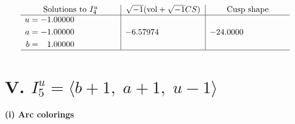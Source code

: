 \documentclass[1p]{elsarticle_modified}
\theoremstyle{definition}
\newcommand{\I}{\sqrt{-1}}
\begin{document}
$$\begin{array}{c|c|c}  
\text{Solutions to }I^u_{4}& \I (\text{vol} + \sqrt{-1}CS) & \text{Cusp shape}\\
 \hline 
\begin{aligned}
u &= -1.00000\phantom{ +0.000000I} \\
a &= -1.00000\phantom{ +0.000000I} \\
b &= \phantom{-}1.00000\phantom{ +0.000000I}\end{aligned}
 & -6.57974\phantom{ +0.000000I} & -24.0000\phantom{ +0.000000I}\\
 \hline 
 \end{array}$$\newpage\newpage\renewcommand{\arraystretch}{1}
\centering \section*{V. $I^u_{5}= \langle b+1,\;a+1,\;u-1 \rangle$}
\flushleft \textbf{(i) Arc colorings}\\
\end{document}
